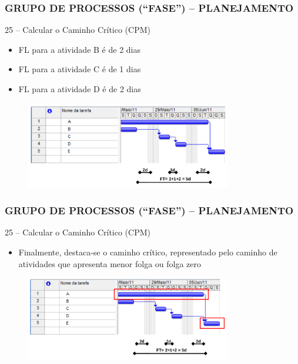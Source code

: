 \begin{frame}
 \frametitle{GRUPO DE PROCESSOS (“FASE”) – PLANEJAMENTO}
25 – Calcular o Caminho Crítico (CPM)
  \begin{itemize}
   \item FL para a atividade B é de 2 dias
   \item FL para a atividade C é de 1 dias
   \item FL para a atividade D é de 2 dias
      \end{itemize}
  \begin{figure}
   \centering
   \includegraphics[width = 0.8\textwidth]{figs/fig11.png}
  \end{figure}
\end{frame}

\begin{frame}
 \frametitle{GRUPO DE PROCESSOS (“FASE”) – PLANEJAMENTO}
25 – Calcular o Caminho Crítico (CPM)
  \begin{itemize}
   \item Finalmente, destaca-se o caminho crítico, representado pelo caminho de atividades que apresenta menor folga ou folga zero
      \end{itemize}
  \begin{figure}
   \centering
   \includegraphics[width = 0.8\textwidth]{figs/fig12.png}
  \end{figure}
\end{frame}


